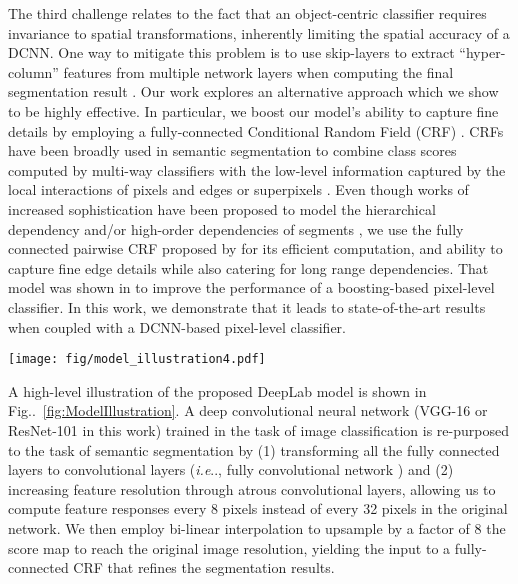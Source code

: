\documentclass[10pt,journal,compsoc]{IEEEtran}
\makeatletter
\newcommand{\figref}[1]{Fig\onedot~\ref{#1}}
\def\onedot{\ifx\@let@token.\else.\null\fi\xspace}
\def\ie{\emph{i.e}\onedot} \def\Ie{\emph{I.e}\onedot}
\makeatother
\begin{document}
The third challenge relates to the fact that an object-centric classifier 
requires invariance to spatial transformations, inherently
limiting the spatial accuracy of a DCNN. One way to mitigate this
problem is to use skip-layers to extract ``hyper-column'' features from multiple network layers when
computing the final segmentation result
\cite{hariharan2014hypercolumns, long2014fully}. Our work explores an
alternative approach which we show to be highly effective. In particular, we
boost our model's ability to capture fine details by employing a fully-connected
Conditional Random Field (CRF) \cite{krahenbuhl2011efficient}. CRFs have been
broadly used in semantic segmentation to combine class scores computed by
multi-way classifiers with the low-level information captured by the local
interactions of pixels and edges
\cite{rother2004grabcut, shotton2009textonboost} or superpixels
\cite{lucchi2011spatial}. Even though works of increased sophistication have
been proposed to model the hierarchical dependency \cite{he2004multiscale,
  ladicky2009associative, lempitsky2011pylon} and/or high-order dependencies
of segments \cite{delong2012fast, gonfaus2010harmony, kohli2009robust, CPY13, Wang15}, we
use the fully connected pairwise CRF proposed by
\cite{krahenbuhl2011efficient} for its efficient computation, and ability to
capture fine edge details while also catering for long range dependencies. That
model was shown in \cite{krahenbuhl2011efficient} to improve the performance of
a boosting-based pixel-level classifier. In this work, we demonstrate that it
leads to state-of-the-art results when coupled with a DCNN-based pixel-level
classifier.

\begin{figure*}[!th]
  \centering
  \texttt{[image: fig/model\_illustration4.pdf]}
  \caption{Model Illustration. A Deep Convolutional Neural Network such as
  VGG-16 or ResNet-101 is employed in a fully convolutional fashion, using
  atrous convolution to reduce the degree of signal downsampling (from 32x
  down 8x). A bilinear interpolation stage enlarges the feature maps to the
  original image resolution. A fully connected CRF is then applied to refine
  the segmentation result and better capture the object boundaries.}
  \label{fig:ModelIllustration}
\end{figure*}

A high-level illustration of the proposed DeepLab model is shown in
\figref{fig:ModelIllustration}. A deep convolutional neural network
(VGG-16 \cite{simonyan2014very} or ResNet-101 \cite{he2015deep} in this work)
trained in the task of image classification is re-purposed to the task of
semantic segmentation by (1) transforming all the fully connected layers
to convolutional layers (\ie, fully convolutional network \cite{long2014fully})
and (2) increasing feature resolution through
atrous convolutional layers, allowing us  to compute feature
responses  every 8 pixels instead of every 32 pixels in the original network. 
We then employ bi-linear interpolation to upsample by a
factor of 8 the score map to reach the original image resolution, yielding the 
input to 
a fully-connected CRF \cite{krahenbuhl2011efficient} that refines the
segmentation results.
\end{document}
